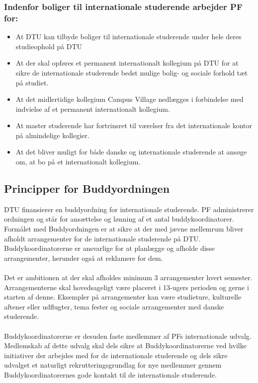 \subsubsection{Indenfor boliger til internationale studerende arbejder PF for:}
\begin{itemize}
\item At DTU kan tilbyde boliger til internationale studerende under hele deres studieophold på DTU
\item At der skal opføres et permanent internationalt kollegium på DTU for at sikre de internationale studerende bedst mulige bolig- og sociale forhold tæt på studiet.
\item At det midlertidige kollegium Campus Village nedlægges i forbindelse med indvielse af et permanent internationalt kollegium.
\item At master studerende har fortrinsret til værelser fra det internationale kontor på almindelige kollegier.
\item At det bliver muligt for både danske og internationale studerende at ansøge om, at bo på et internationalt kollegium.
\end{itemize}

\subsection{Principper for Buddyordningen}
DTU finansierer en buddyordning for internationale studerende. PF administrerer ordningen og står for ansættelse og lønning af et antal buddykoordinatorer. Formålet med Buddyordningen er at sikre at der med jævne mellemrum bliver afholdt arrangementer for de internationale studerende på DTU. Buddykoordinatorerne er ansvarlige for at planlægge og afholde disse arrangementer, herunder også at reklamere for dem.\\
\\
Det er ambitionen at der skal afholdes minimum 3 arrangementer hvert semester. Arrangementerne skal hovedsageligt være placeret i 13-ugers perioden og gerne i starten af denne. Eksempler på arrangementer kan være studieture, kulturelle aftener eller udflugter, tema fester og sociale arrangementer med danske studerende.\\
\\
Buddykoordinatorerne er desuden faste medlemmer af PFs internationale udvalg. Medlemskab af dette udvalg skal dels sikre at Buddykoordinatorerne ved hvilke initiativer der arbejdes med for de internationale studerende og dels sikre udvalget et naturligt rekrutteringsgrundlag for nye medlemmer gennem Buddykoordinatorernes gode kontakt til de internationale studerende.

